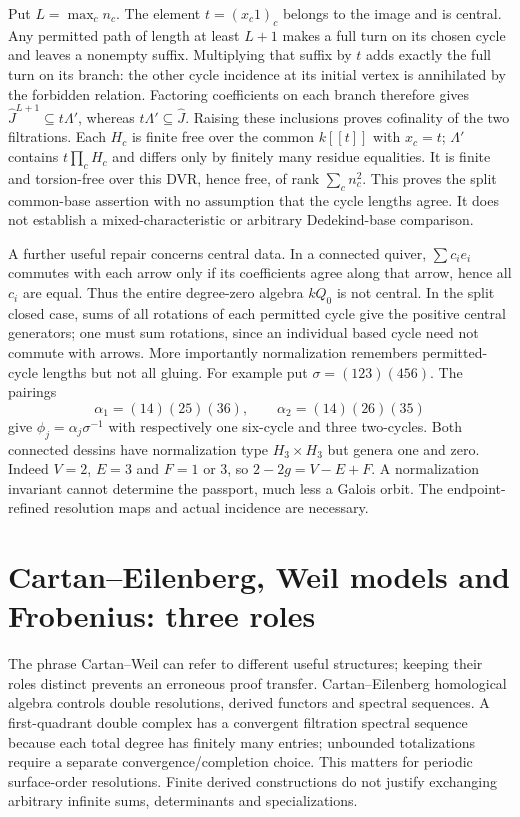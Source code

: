 Put $L=\max_c n_c$. The element $t=(x_c1)_c$ belongs to the image and is central. Any permitted path of length at least $L+1$ makes a full turn on its chosen cycle and leaves a nonempty suffix. Multiplying that suffix by $t$ adds exactly the full turn on its branch: the other cycle incidence at its initial vertex is annihilated by the forbidden relation. Factoring coefficients on each branch therefore gives $\widehat J^{L+1}\subseteq t\Lambda'$, whereas $t\Lambda'\subseteq\widehat J$. Raising these inclusions proves cofinality of the two filtrations. Each $H_c$ is finite free over the common $k[[t]]$ with $x_c=t$; $\Lambda'$ contains $t\prod_cH_c$ and differs only by finitely many residue equalities. It is finite and torsion-free over this DVR, hence free, of rank $\sum_c n_c^2$. This proves the split common-base assertion with no assumption that the cycle lengths agree. It does not establish a mixed-characteristic or arbitrary Dedekind-base comparison.

A further useful repair concerns central data. In a connected quiver, $\sum c_ie_i$ commutes with each arrow only if its coefficients agree along that arrow, hence all $c_i$ are equal. Thus the entire degree-zero algebra $kQ_0$ is not central. In the split closed case, sums of all rotations of each permitted cycle give the positive central generators; one must sum rotations, since an individual based cycle need not commute with arrows. More importantly normalization remembers permitted-cycle lengths but not all gluing. For example put $\sigma=(123)(456)$. The pairings
\[
 \alpha_1=(14)(25)(36),\qquad \alpha_2=(14)(26)(35)
\]
give $\phi_j=\alpha_j\sigma^{-1}$ with respectively one six-cycle and three two-cycles. Both connected dessins have normalization type $H_3\times H_3$ but genera one and zero. Indeed $V=2$, $E=3$ and $F=1$ or $3$, so $2-2g=V-E+F$. A normalization invariant cannot determine the passport, much less a Galois orbit. The endpoint-refined resolution maps and actual incidence are necessary.

\section{Cartan--Eilenberg, Weil models and Frobenius: three roles}
The phrase Cartan--Weil can refer to different useful structures; keeping their roles distinct prevents an erroneous proof transfer. Cartan--Eilenberg homological algebra controls double resolutions, derived functors and spectral sequences. A first-quadrant double complex has a convergent filtration spectral sequence because each total degree has finitely many entries; unbounded totalizations require a separate convergence/completion choice. This matters for periodic surface-order resolutions. Finite derived constructions do not justify exchanging arbitrary infinite sums, determinants and specializations.

